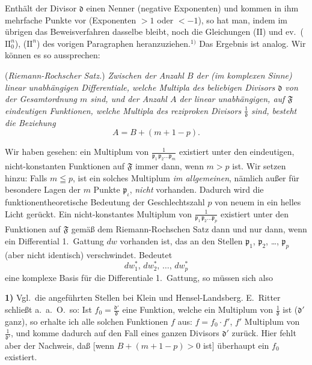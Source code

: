 \documentclass{article}
\begin{document}
Enthält der Divisor $\mathfrak{d}$ einen Nenner (negative Exponenten) und kommen in ihm mehrfache Punkte vor (Exponenten $> 1$ oder $< -1$), so hat man, indem im übrigen das Beweisverfahren dasselbe bleibt, noch die Gleichungen (II) und ev.\ ($\mathrm{II}_0^n$), ($\mathrm{II}^n$) des vorigen Paragraphen heranzuziehen.${}^{1)}$ Das Ergebnis ist analog. Wir können es so aussprechen:

(\emph{Riemann-Rochscher Satz.}) \emph{Zwischen der Anzahl $B$ der (im komplexen Sinne) linear unabhängigen Differentiale, welche Multipla des beliebigen Divisors $\mathfrak{d}$ von der Gesamtordnung $m$ sind, und der Anzahl $A$ der linear unabhängigen, auf $\mathfrak{F}$ eindeutigen Funktionen, welche Multipla des reziproken Divisors $\frac{1}{\mathfrak{d}}$ sind, besteht die Beziehung}
\[ A = B + (m + 1 - p). \]

Wir haben gesehen: ein Multiplum von $\frac{1}{\mathfrak{p}_1 \, \mathfrak{p}_2 \dots \mathfrak{p}_m}$ existiert unter den eindeutigen, nicht-konstanten Funktionen auf $\mathfrak{F}$ immer dann, wenn $m > p$ ist. Wir setzen hinzu: Falls $m \leqq p$, ist ein solches Multiplum \emph{im allgemeinen}, nämlich außer für besondere Lagen der $m$ Punkte $\mathfrak{p}_\iota$, \emph{nicht} vorhanden. Dadurch wird die funktionentheoretische Bedeutung der Geschlechtszahl $p$ von neuem in ein helles Licht gerückt. Ein nicht-konstantes Multiplum von $\frac{1}{\mathfrak{p}_1 \, \mathfrak{p}_2 \dots \mathfrak{p}_p}$ existiert unter den Funktionen auf $\mathfrak{F}$ gemäß dem Riemann-Rochschen Satz dann und nur dann, wenn ein Differential 1.\ Gattung $dw$ vorhanden ist, das an den Stellen $\mathfrak{p}_1$, $\mathfrak{p}_2$, \dots, $\mathfrak{p}_p$ (aber nicht identisch) verschwindet. Bedeutet
\[ dw_1^*, \, dw_2^*, \, \dots, \, dw_p^* \]
eine komplexe Basis für die Differentiale 1.\ Gattung, so müssen sich also

\textbf{1)} Vgl.\ die angeführten Stellen bei Klein und Hensel-Landsberg. E.~Ritter schließt a.~a.~O.\ so: Ist $f_0 = \frac{\mathfrak{d}'}{\mathfrak{d}}$ eine Funktion, welche ein Multiplum von $\frac{1}{\mathfrak{d}}$ ist ($\mathfrak{d}'$ ganz), so erhalte ich alle solchen Funktionen $f$ aus: $f = f_0 \cdot f'$, $f'$ Multiplum von $\frac{1}{\mathfrak{d}'}$, und komme dadurch auf den Fall eines ganzen Divisors $\mathfrak{d}'$ zurück. Hier fehlt aber der Nachweis, daß [wenn $B + (m + 1 - p) > 0$ ist] überhaupt ein $f_0$ existiert.
\end{document}
